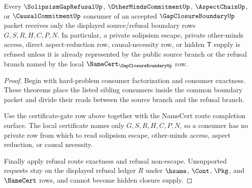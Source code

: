\begin{theorem}
\label{thm:gap-closure-boundary-solipsism-refusal-row}
Every $\SolipsismGapRefusalUp$, $\OtherMindsCommitmentUp$,
$\AspectChainUp$, or $\CausalCommitmentUp$ consumer of an accepted
$\GapClosureBoundaryUp$ packet receives only the displayed source/refusal
boundary rows $G,S,R,H,C,P,N$. In particular, a private solipsism escape,
private other-minds access, direct aspect-reduction row, causal-necessity row,
or hidden $\mathsf{T}$ supply is refused unless it is already represented by
the public source branch or the refusal branch named by the local
$\NameCert_{\GapClosureBoundaryUp}$ row.
\end{theorem}
\begin{proof}
Begin with hard-problem consumer factorization and consumer exactness. These
theorems place the listed sibling consumers inside the common boundary packet
and divide their reads between the source branch and the refusal branch.

Use the certificate-gate row above together with the NameCert route completion
surface. The local certificate names only $G,S,R,H,C,P,N$, so a consumer has
no private row from which to read solipsism escape, other-minds access, aspect
reduction, or causal necessity.

Finally apply refusal route exactness and refusal non-escape. Unsupported
requests stay on the displayed refusal ledger $R$ under $\hsame$, $\Cont$,
$\Pkg$, and $\NameCert$ rows, and cannot become hidden closure supply.
\end{proof}
